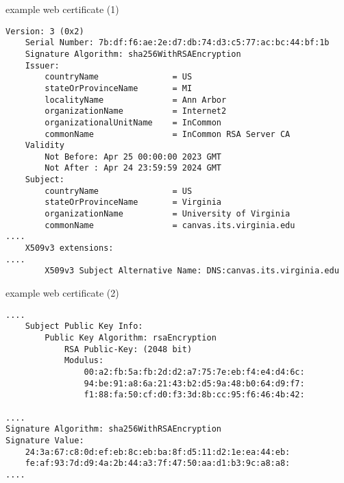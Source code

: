 \begin{frame}[fragile]{example web certificate (1)}
\begin{Verbatim}[fontsize=\scriptsize]
    Version: 3 (0x2)
    Serial Number: 7b:df:f6:ae:2e:d7:db:74:d3:c5:77:ac:bc:44:bf:1b
    Signature Algorithm: sha256WithRSAEncryption
    Issuer:
        countryName               = US
        stateOrProvinceName       = MI
        localityName              = Ann Arbor
        organizationName          = Internet2
        organizationalUnitName    = InCommon
        commonName                = InCommon RSA Server CA
    Validity
        Not Before: Apr 25 00:00:00 2023 GMT
        Not After : Apr 24 23:59:59 2024 GMT
    Subject:
        countryName               = US
        stateOrProvinceName       = Virginia
        organizationName          = University of Virginia
        commonName                = canvas.its.virginia.edu
....
    X509v3 extensions:
....
        X509v3 Subject Alternative Name: DNS:canvas.its.virginia.edu
\end{Verbatim}
\end{frame}

\begin{frame}[fragile]{example web certificate (2)}
\begin{Verbatim}[fontsize=\scriptsize]
....
    Subject Public Key Info:
        Public Key Algorithm: rsaEncryption
            RSA Public-Key: (2048 bit)
            Modulus:
                00:a2:fb:5a:fb:2d:d2:a7:75:7e:eb:f4:e4:d4:6c:
                94:be:91:a8:6a:21:43:b2:d5:9a:48:b0:64:d9:f7:
                f1:88:fa:50:cf:d0:f3:3d:8b:cc:95:f6:46:4b:42:

....
Signature Algorithm: sha256WithRSAEncryption
Signature Value:
    24:3a:67:c8:0d:ef:eb:8c:eb:ba:8f:d5:11:d2:1e:ea:44:eb:
    fe:af:93:7d:d9:4a:2b:44:a3:7f:47:50:aa:d1:b3:9c:a8:a8:
....
\end{Verbatim}
\end{frame}

